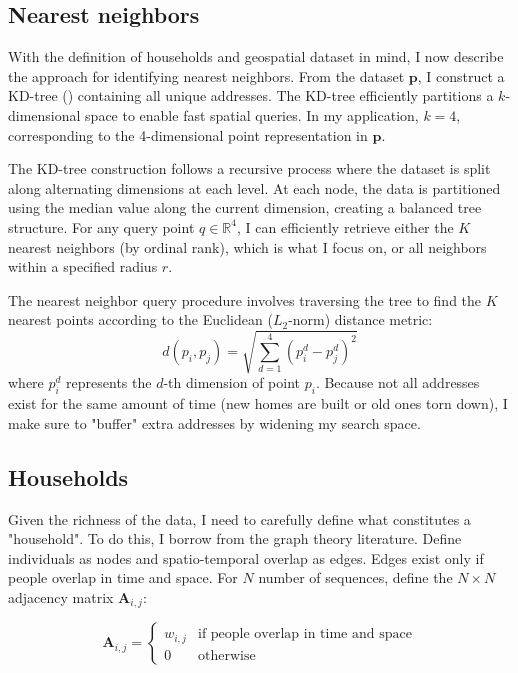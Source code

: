 \documentclass[main.tex]{subfiles}
\begin{document}
\subsection{Nearest neighbors}
With the definition of households and geospatial dataset in mind, I now describe the approach for identifying nearest neighbors. From the dataset $\mathbf{p}$, I construct a KD-tree (\textcite{bentley1975multidimensional}) containing all unique addresses. The KD-tree efficiently partitions a $k$-dimensional space to enable fast spatial queries. In my application, $k=4$, corresponding to the 4-dimensional point representation in $\mathbf{p}$.

The KD-tree construction follows a recursive process where the dataset is split along alternating dimensions at each level. At each node, the data is partitioned using the median value along the current dimension, creating a balanced tree structure.
For any query point $q \in \mathbb{R}^4$, I can efficiently retrieve either the $K$ nearest neighbors (by ordinal rank), which is what I focus on, or all neighbors within a specified radius $r$. 

The nearest neighbor query procedure involves traversing the tree to find the $K$ nearest points according to the Euclidean ($L_2$-norm) distance metric:
\begin{equation}
d(p_i, p_j) = \sqrt{\sum_{d=1}^{4} (p_i^d - p_j^d)^2}
\end{equation}
where $p_i^d$ represents the $d$-th dimension of point $p_i$. Because not all addresses exist for the same amount of time (new homes are built or old ones torn down), I make sure to "buffer" extra addresses by widening my search space. 


\subsection{Households}
Given the richness of the data, I need to carefully define what constitutes a "household". To do this, I borrow from the graph theory literature. Define individuals as nodes and spatio-temporal overlap as edges. Edges exist only if people overlap in time and space. For $N$ number of sequences, define the $N \times N$ adjacency matrix $\mathbf{A}_{i,j}$:

\begin{equation}
    \mathbf{A}_{i,j} = \begin{cases}
        w_{i,j} & \text{if people overlap in time and space} \\
        0 & \text{otherwise}
    \end{cases}
\end{equation}
\end{document}
